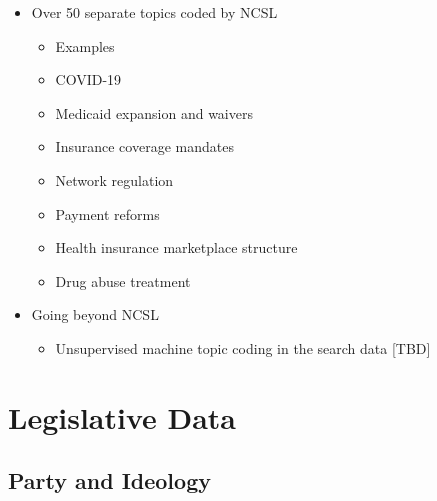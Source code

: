 \documentclass[
  oneside]{book}
\providecommand{\tightlist}{%
  \setlength{\itemsep}{0pt}\setlength{\parskip}{0pt}}
\begin{document}
\begin{itemize}
\tightlist
\item
  Over 50 separate topics coded by NCSL

  \begin{itemize}
  \tightlist
  \item
    Examples
  \item
    COVID-19
  \item
    Medicaid expansion and waivers
  \item
    Insurance coverage mandates
  \item
    Network regulation
  \item
    Payment reforms
  \item
    Health insurance marketplace structure
  \item
    Drug abuse treatment
  \end{itemize}
\item
  Going beyond NCSL

  \begin{itemize}
  \tightlist
  \item
    Unsupervised machine topic coding in the search data {[}TBD{]}
  \end{itemize}
\end{itemize}

\hypertarget{legislative-data}{%
\section{Legislative Data}\label{legislative-data}}

\hypertarget{party-and-ideology}{%
\subsection{Party and Ideology}\label{party-and-ideology}}
\end{document}
